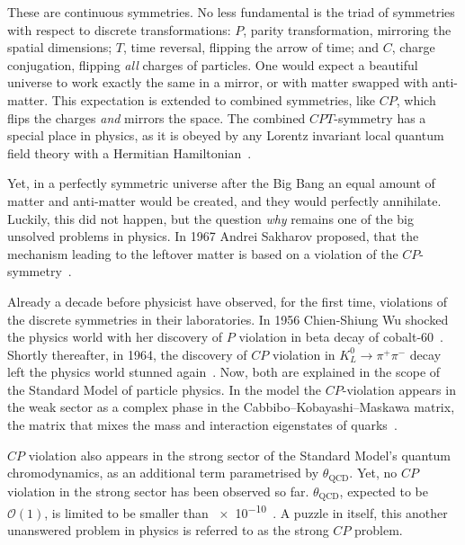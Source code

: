 These are continuous symmetries. No less fundamental is the triad of symmetries with respect to discrete transformations: $P$, parity transformation, mirroring the spatial dimensions; $T$, time reversal, flipping the arrow of time; and $C$, charge conjugation, flipping \emph{all} charges of particles. One would expect a beautiful universe to work exactly the same in a mirror, or with matter swapped with anti-matter. This expectation is extended to combined symmetries, like $CP$, which flips the charges \emph{and} mirrors the space. The combined $CPT$-symmetry has a special place in physics, as it is obeyed by any Lorentz invariant local quantum field theory with a Hermitian Hamiltonian~\cite{Sachs1987}.

Yet, in a perfectly symmetric universe after the Big Bang an equal amount of matter and anti-matter would be created, and they would perfectly annihilate. Luckily, this did not happen, but the question \emph{why} remains one of the big unsolved problems in physics.
In 1967 Andrei Sakharov proposed, that the mechanism leading to the leftover matter  is based on a violation of the $CP$-symmetry~\cite{0038-5670-34-5-A08}.

Already a decade before physicist have observed, for the first time, violations of the discrete symmetries in their laboratories.
In 1956 Chien-Shiung Wu shocked the physics world with her discovery of $P$ violation in beta decay of cobalt-60~\cite{PhysRev.105.1413}. Shortly thereafter, in 1964, the discovery of $CP$ violation in $K^0_L \rightarrow \pi^+ \pi^-$ decay left the physics world stunned again~\cite{PhysRevLett.13.138}. Now, both are explained in the scope of the Standard Model of particle physics. In the model the $CP$-violation appears in the weak sector as a complex phase in the Cabbibo--Kobayashi--Maskawa matrix, the matrix that mixes the mass and interaction eigenstates of quarks~\cite{doi:10.1143/PTP.49.652}.

$CP$ violation also appears in the strong sector of the Standard Model's quantum chromodynamics, as an additional term parametrised by $\theta_\text{QCD}$. Yet, no $CP$ violation in the strong sector has been observed so far. $\theta_\text{QCD}$, expected to be $\mathcal{O}(1)$, is limited to be smaller than \num{e-10}~\cite{PDG2016}. A puzzle in itself, this another unanswered problem in physics is referred to as the strong $CP$ problem.

